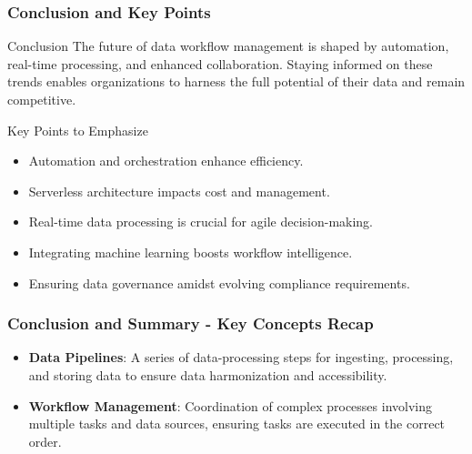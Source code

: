 \documentclass[aspectratio=169]{beamer}
\begin{document}
\begin{frame}[fragile]
    \frametitle{Conclusion and Key Points}
    \begin{block}{Conclusion}
        The future of data workflow management is shaped by automation, real-time processing, and enhanced collaboration. Staying informed on these trends enables organizations to harness the full potential of their data and remain competitive.
    \end{block}

    \begin{block}{Key Points to Emphasize}
        \begin{itemize}
            \item Automation and orchestration enhance efficiency.
            \item Serverless architecture impacts cost and management.
            \item Real-time data processing is crucial for agile decision-making.
            \item Integrating machine learning boosts workflow intelligence.
            \item Ensuring data governance amidst evolving compliance requirements.
        \end{itemize}
    \end{block}
\end{frame}

\begin{frame}[fragile]
  \frametitle{Conclusion and Summary - Key Concepts Recap}
  \begin{itemize}
    \item \textbf{Data Pipelines}: 
    A series of data-processing steps for ingesting, processing, and storing data to ensure data harmonization and accessibility.
    
    \item \textbf{Workflow Management}: 
    Coordination of complex processes involving multiple tasks and data sources, ensuring tasks are executed in the correct order.
  \end{itemize}
\end{frame}
\end{document}
